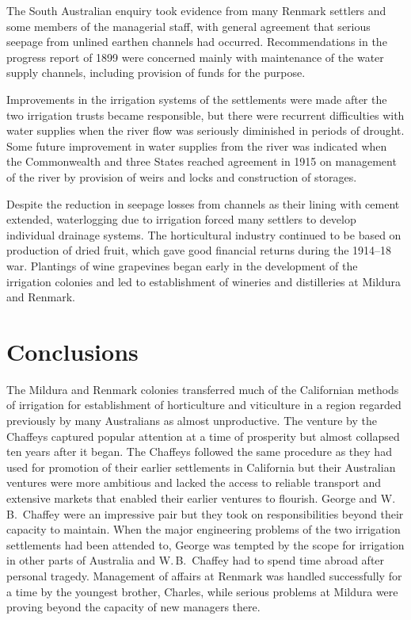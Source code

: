 The South Australian enquiry took evidence from many Renmark settlers
and some members of the managerial staff, with general agreement that
serious seepage from unlined earthen channels had occurred.
Recommendations in the progress report of 1899 were concerned mainly
with maintenance of the water supply channels, including provision of
funds for the purpose.

Improvements in the irrigation systems of the settlements were made
after the two irrigation trusts became responsible, but there were
recurrent difficulties with water supplies when the river flow was
seriously diminished in periods of drought.  Some future improvement
in water supplies from the river was indicated when the Commonwealth
and three States reached agreement in 1915 on management of the river
by provision of weirs and locks and construction of storages.

Despite the reduction in seepage losses from channels as their lining
with cement extended, waterlogging due to irrigation forced many
settlers to develop individual drainage systems.  The horticultural
industry continued to be based on production of dried fruit, which
gave good financial returns during the 1914--18 war.  Plantings of
wine grapevines began early in the development of the irrigation
colonies and led to establishment of wineries and distilleries at
Mildura and Renmark.

\section*{Conclusions}

The Mildura and Renmark colonies transferred much of the Californian
methods of irrigation for establishment of horticulture and
viticulture in a region regarded previously by many Australians as
almost unproductive.  The venture by the Chaffeys captured popular
attention at a time of prosperity but almost collapsed ten years after
it began.  The Chaffeys followed the same procedure as they had used
for promotion of their earlier settlements in California but their
Australian ventures were more ambitious and lacked the access to
reliable transport and extensive markets that enabled their earlier
ventures to flourish.  George and W.\,B.~Chaffey were an impressive
pair but they took on responsibilities beyond their capacity to
maintain.  When the major engineering problems of the two irrigation
settlements had been attended to, George was tempted by the scope for
irrigation in other parts of Australia and W.\,B.~Chaffey had to spend
time abroad after personal tragedy.  Management of affairs at Renmark
was handled successfully for a time by the youngest brother, Charles,
while serious problems at Mildura were proving beyond the capacity of
new managers there.

